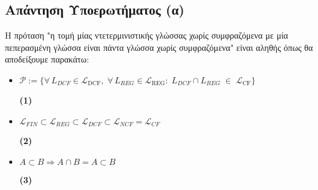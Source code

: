 \subsection{Απάντηση Υποερωτήματος (α)}
\label{ssec:Solution_3.1}
\doublespacing
Η πρόταση "η τομή μίας ντετερμινιστικής γλώσσας χωρίς συμφραζόμενα με μία πεπερασμένη γλώσσα είναι πάντα γλώσσα
χωρίς συμφραζόμενα" είναι αληθής όπως θα αποδείξουμε παρακάτω:

\begin{tcolorbox}[colback=yellow!15!white, colframe=blue!50!white,
	fonttitle=\bfseries\Large, title = Απόδειξη]
	\centering
\begin{itemize}
	\itemsep0em

	\item $\mathcal{P} := \{\forall\,L_{DCF}\in\mathcal L_{\mathrm{DCF}},\;\forall\,L_{REG}\in\mathcal
	L_{\mathrm{REG}}:\;L_{DCF}\cap L_{REG}\;\in\;\mathcal L_{\mathrm{CF}}\}$
	\reducevspace\reducevspace\reducevspace\reducevspace\reducevspace\reducevspace\reducevspace
	\reducevspace\reducevspace\reducevspace\reducevspace\reducevspace\reducevspace\reducevspace
	\reducevspace\reducevspace\reducevspace\reducevspace\reducevspace\reducevspace\reducevspace
	\begin{flushright}\hypertarget{3.1.1}{\bf{(1)}}\end{flushright}


	\item $\mathcal{L}_{FIN} \subset \mathcal{L}_{REG} \subset \mathcal{L}_{DCF} \subset \mathcal{L}_{NCF} =
	\mathcal{L}_{CF}$
	\reducevspace\reducevspace\reducevspace\reducevspace\reducevspace\reducevspace\reducevspace
	\reducevspace\reducevspace\reducevspace\reducevspace\reducevspace\reducevspace\reducevspace
	\reducevspace\reducevspace\reducevspace\reducevspace\reducevspace\reducevspace\reducevspace
	\begin{flushright}\hypertarget{3.1.2}{\bf{(2)}}\end{flushright}

	\item $A \subset B \Rightarrow A \cap B = A \subset B$
	\reducevspace\reducevspace\reducevspace\reducevspace\reducevspace\reducevspace\reducevspace
	\reducevspace\reducevspace\reducevspace\reducevspace\reducevspace\reducevspace\reducevspace
	\reducevspace\reducevspace\reducevspace\reducevspace\reducevspace\reducevspace\reducevspace
	\begin{flushright}\hypertarget{3.1.3}{\bf{(3)}}\end{flushright}


\end{itemize}
\end{tcolorbox}
